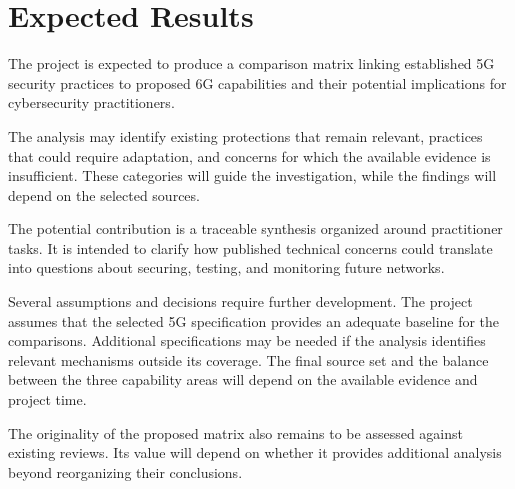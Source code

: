 \chapter{Expected Results}
\label{ch:expected-results}

The project is expected to produce a comparison matrix
linking established 5G security practices to proposed
6G capabilities and their potential implications for
cybersecurity practitioners.

The analysis may identify existing protections that
remain relevant, practices that could require adaptation,
and concerns for which the available evidence is
insufficient. These categories will guide the
investigation, while the findings will depend on
the selected sources.

The potential contribution is a traceable synthesis
organized around practitioner tasks. It is intended
to clarify how published technical concerns could
translate into questions about securing, testing,
and monitoring future networks.

Several assumptions and decisions require further
development. The project assumes that the selected
5G specification provides an adequate baseline for
the comparisons. Additional specifications may be
needed if the analysis identifies relevant mechanisms
outside its coverage. The final source set and the
balance between the three capability areas will
depend on the available evidence and project time.

The originality of the proposed matrix also remains
to be assessed against existing reviews. Its value
will depend on whether it provides additional
analysis beyond reorganizing their conclusions.